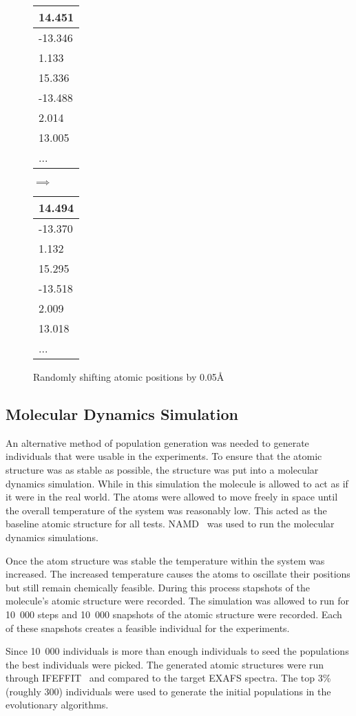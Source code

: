 \begin{figure}
	\centering
	\begin{tabular}{ | l | }
		\hline
		14.451 \\ \hline
		-13.346 \\ \hline
		1.133 \\ \hline
		15.336 \\ \hline
		-13.488 \\ \hline
		2.014 \\ \hline
		13.005 \\ \hline
		... \\ \hline
	\end{tabular}
	\qquad$\implies$\qquad
	\begin{tabular}{ | l | }
		\hline
		14.494 \\ \hline
		-13.370 \\ \hline
		1.132 \\ \hline
		15.295 \\ \hline
		-13.518 \\ \hline
		2.009 \\ \hline
		13.018 \\ \hline
		... \\ \hline
	\end{tabular}
	\caption{Randomly shifting atomic positions by 0.05\AA}
	\label{fig:random-shift}
\end{figure}

\subsection{Molecular Dynamics Simulation}
\label{subsec:molecular-population}

An alternative method of population generation was needed to generate individuals that were usable in the experiments. To ensure that the atomic structure was as stable as possible, the structure was put into a molecular dynamics simulation. While in this simulation the molecule is allowed to act as if it were in the real world. The atoms were allowed to move freely in space until the overall temperature of the system was reasonably low. This acted as the baseline atomic structure for all tests. NAMD~\cite{namd} was used to run the molecular dynamics simulations.

Once the atom structure was stable the temperature within the system was increased. The increased temperature causes the atoms to oscillate their positions but still remain chemically feasible. During this process stapshots of the molecule's atomic structure were recorded. The simulation was allowed to run for 10\ 000 steps and 10\ 000 snapshots of the atomic structure were recorded. Each of these snapshots creates a feasible individual for the experiments.

Since 10\ 000 individuals is more than enough individuals to seed the populations the best individuals were picked. The generated atomic structures were run through IFEFFIT~\cite{ifeffit} and compared to the target EXAFS spectra. The top 3\% (roughly 300) individuals were used to generate the initial populations in the evolutionary algorithms.